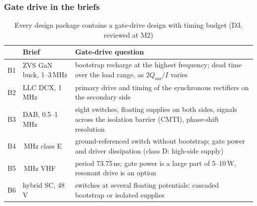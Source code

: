\begin{frame}
	\frametitle{Gate drive in the briefs}
	\begin{table}
		\centering
		\footnotesize
		\begin{tabular}{|l|>{\raggedright\arraybackslash}p{3.2cm}|>{\raggedright\arraybackslash}p{9.4cm}|}
			\hline
			   & \textbf{Brief}           & \textbf{Gate-drive question}                                                                                        \\
			\hline
			B1 & ZVS GaN buck, 1--3\,MHz  & bootstrap recharge at the highest frequency; dead time over the load range, as $2Q_\mathrm{oss}/I$ varies            \\
			B2 & LLC DCX, 1\,MHz          & primary drive and timing of the synchronous rectifiers on the secondary side                                        \\
			B3 & DAB, 0.5--1\,MHz         & eight switches, floating supplies on both sides, signals across the isolation barrier (CMTI), phase-shift resolution \\
			B4 & 6.78\,MHz class E        & ground-referenced switch without bootstrap; gate power and driver dissipation (class D: high-side supply)           \\
			B5 & 13.56\,MHz VHF           & period 73.75\,ns; gate power is a large part of 5--10\,W, resonant drive is an option                                 \\
			B6 & hybrid SC, 48\,V         & switches at several floating potentials: cascaded bootstrap or isolated supplies                                    \\
			\hline
		\end{tabular}
		\caption{Every design package contains a gate-drive design with timing budget (D3, reviewed at M2)}
	\end{table}
\end{frame}

